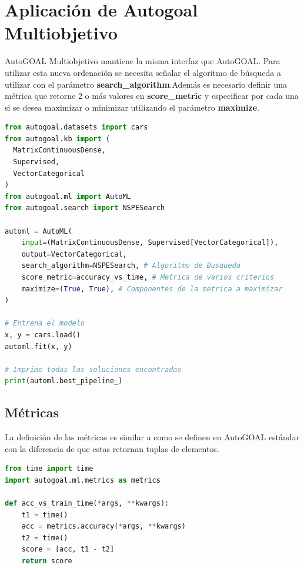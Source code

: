 \section{Aplicaci\'on de Autogoal Multiobjetivo}
AutoGOAL Multiobjetivo mantiene la misma interfaz que AutoGOAL. Para utilizar esta nueva ordenaci\'on se necesita  se\~nalar el algoritmo de b\'usqueda a utilizar con el par\'ametro \textbf{search\_algorithm}.Adem\'as es necesario definir una m\'etrica que retorne 2 o m\'as valores en \textbf{score\_metric} y especificar por cada una si se desea maximizar o minimizar utilizando el par\'ametro  \textbf{maximize}. 

\begin{lstlisting}[caption=Utilizando NPSGE, language=Python]
from autogoal.datasets import cars
from autogoal.kb import (
  MatrixContinuousDense,
  Supervised,
  VectorCategorical
)
from autogoal.ml import AutoML
from autogoal.search import NSPESearch

automl = AutoML(
    input=(MatrixContinuousDense, Supervised[VectorCategorical]),
    output=VectorCategorical,
    search_algorithm=NSPESearch, # Algoritmo de Busqueda
    score_metric=accuracy_vs_time, # Metrica de varios criterios
    maximize=(True, True), # Componentes de la metrica a maximizar
)

# Entrena el modelo
x, y = cars.load()
automl.fit(x, y)

# Imprime todas las soluciones encontradas
print(automl.best_pipeline_) 
\end{lstlisting}

\subsection{M\'etricas}
La definici\'on de las m\'etricas es similar a como se definen en AutoGOAL est\'andar con la diferencia de que estas retornan tuplas de elementos.

\begin{lstlisting}[caption=Ejemplo de m\'etrica: accuracy contra tiempo, language=Python]
from time import time
import autogoal.ml.metrics as metrics

def acc_vs_train_time(*args, **kwargs):
    t1 = time()
    acc = metrics.accuracy(*args, **kwargs)
    t2 = time()
    score = [acc, t1 - t2]
    return score
\end{lstlisting}
